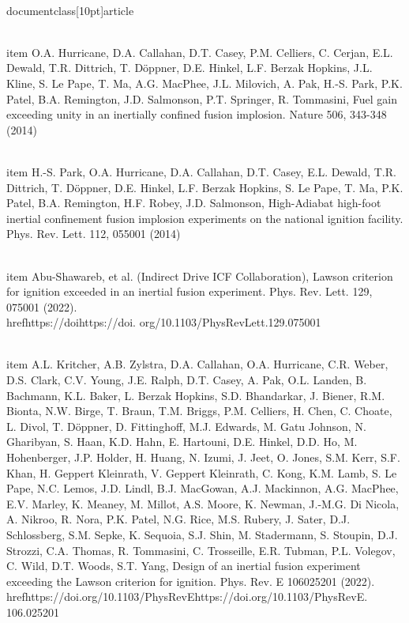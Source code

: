 \\documentclass[10pt]{article}
\begin{document}
{{{{{{  \\item O.A. Hurricane, D.A. Callahan, D.T. Casey, P.M. Celliers, C. Cerjan, E.L. Dewald, T.R. Dittrich, T. Döppner, D.E. Hinkel, L.F. Berzak Hopkins, J.L. Kline, S. Le Pape, T. Ma, A.G. MacPhee, J.L. Milovich, A. Pak, H.-S. Park, P.K. Patel, B.A. Remington, J.D. Salmonson, P.T. Springer, R. Tommasini, Fuel gain exceeding unity in an inertially confined fusion implosion. Nature 506, 343-348 (2014)

  \\item H.-S. Park, O.A. Hurricane, D.A. Callahan, D.T. Casey, E.L. Dewald, T.R. Dittrich, T. Döppner, D.E. Hinkel, L.F. Berzak Hopkins, S. Le Pape, T. Ma, P.K. Patel, B.A. Remington, H.F. Robey, J.D. Salmonson, High-Adiabat high-foot inertial confinement fusion implosion experiments on the national ignition facility. Phys. Rev. Lett. 112, 055001 (2014)

  \\item Abu-Shawareb, et al. (Indirect Drive ICF Collaboration), Lawson criterion for ignition exceeded in an inertial fusion experiment. Phys. Rev. Lett. 129, 075001 (2022). \\href{https://doi}{https://doi}. org/10.1103/PhysRevLett.129.075001

  \\item A.L. Kritcher, A.B. Zylstra, D.A. Callahan, O.A. Hurricane, C.R. Weber, D.S. Clark, C.V. Young, J.E. Ralph, D.T. Casey, A. Pak, O.L. Landen, B. Bachmann, K.L. Baker, L. Berzak Hopkins, S.D. Bhandarkar, J. Biener, R.M. Bionta, N.W. Birge, T. Braun, T.M. Briggs, P.M. Celliers, H. Chen, C. Choate, L. Divol, T. Döppner, D. Fittinghoff, M.J. Edwards, M. Gatu Johnson, N. Gharibyan, S. Haan, K.D. Hahn, E. Hartouni, D.E. Hinkel, D.D. Ho, M. Hohenberger, J.P. Holder, H. Huang, N. Izumi, J. Jeet, O. Jones, S.M. Kerr, S.F. Khan, H. Geppert Kleinrath, V. Geppert Kleinrath, C. Kong, K.M. Lamb, S. Le Pape, N.C. Lemos, J.D. Lindl, B.J. MacGowan, A.J. Mackinnon, A.G. MacPhee, E.V. Marley, K. Meaney, M. Millot, A.S. Moore, K. Newman, J.-M.G. Di Nicola, A. Nikroo, R. Nora, P.K. Patel, N.G. Rice, M.S. Rubery, J. Sater, D.J. Schlossberg, S.M. Sepke, K. Sequoia, S.J. Shin, M. Stadermann, S. Stoupin, D.J. Strozzi, C.A. Thomas, R. Tommasini, C. Trosseille, E.R. Tubman, P.L. Volegov, C. Wild, D.T. Woods, S.T. Yang, Design of an inertial fusion experiment exceeding the Lawson criterion for ignition. Phys. Rev. E 106025201 (2022). \\href{https://doi.org/10.1103/PhysRevE}{https://doi.org/10.1103/PhysRevE}. 106.025201

}}}}}}
\end{document}
